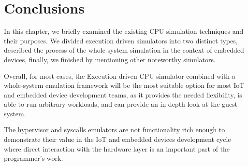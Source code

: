 \section{Conclusions}

In this chapter, we briefly examined the existing CPU simulation techniques and their purposes. We divided execution
driven simulators into two distinct types, described the process of the whole system simulation 
in the context of embedded devices, finally, we finished by mentioning other noteworthy simulators.

Overall, for most cases, the Execution-driven CPU simulator combined with a whole-system emulation framework will be the
most suitable option for most IoT and embedded device development teams, as it provides the needed flexibility, is able
to run arbitrary workloads, and can provide an in-depth look at the guest system.

The hypervisor and syscalls emulators are not functionality rich enough to demonstrate their value in the IoT and
embedded devices development cycle where direct interaction with the hardware layer is an important part of the programmer's work.